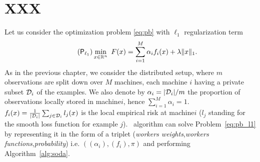 \section{XXX}\label{sec:soda-identiification}
Let us consider the optimization problem \eqref{eq:pb} with $\ell_1$ regularization term
\begin{align}\label{eq:pb_l1}
\tag{$\mathsf{P}_{\ell_1}$}
\min_{x\in\mathbb{R}^n}  ~ F(x) =  \sum_{i=1}^M  \alpha_i  f_i(x)  +  \lambda\|x\|_1.
\end{align}
As in the previous chapter, we consider the distributed setup, where $m$ observations are split down over $M$ machines, each machine $i$ having a private subset $\mathcal{D}_i$ of the examples. We also denote by $\alpha_i= |\mathcal{D}_i|/m$ the proportion of observations locally stored in machine\;$i$, hence $\sum_{i=1}^M\alpha_i = 1$. $f_i(x) = \frac{1}{|\mathcal{D}_i|}  \sum_{j\in\mathcal{D}_i}l_j(x) $ is the local empirical risk at machine\;$i$ ($l_j$ standing for the smooth loss function for example $j$). \SP~algorithm can solve Problem~\eqref{eq:pb_l1} by representing it in the form of a triplet (\emph{workers weights},\emph{workers functions},\emph{probability}) i.e. $((\alpha_i),(f_i),\pi)$ and performing Algorithm~\ref{alg:soda}.
